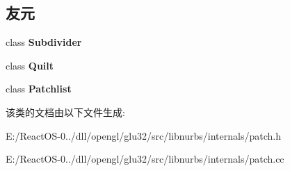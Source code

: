 \subsection*{友元}
\begin{DoxyCompactItemize}
\item 
\mbox{\label{class_patch_aa261a4fe48ec5e75166591417d334c67}} 
class {\bfseries Subdivider}
\item 
\mbox{\label{class_patch_a157306f2324d4cc14723e1ef7d4fda90}} 
class {\bfseries Quilt}
\item 
\mbox{\label{class_patch_a9ef465ad781cfb3e9fae5d4ae98e24f4}} 
class {\bfseries Patchlist}
\end{DoxyCompactItemize}


该类的文档由以下文件生成\+:\begin{DoxyCompactItemize}
\item 
E\+:/\+React\+O\+S-\/0../dll/opengl/glu32/src/libnurbs/internals/patch.\+h\item 
E\+:/\+React\+O\+S-\/0../dll/opengl/glu32/src/libnurbs/internals/patch.\+cc\end{DoxyCompactItemize}
